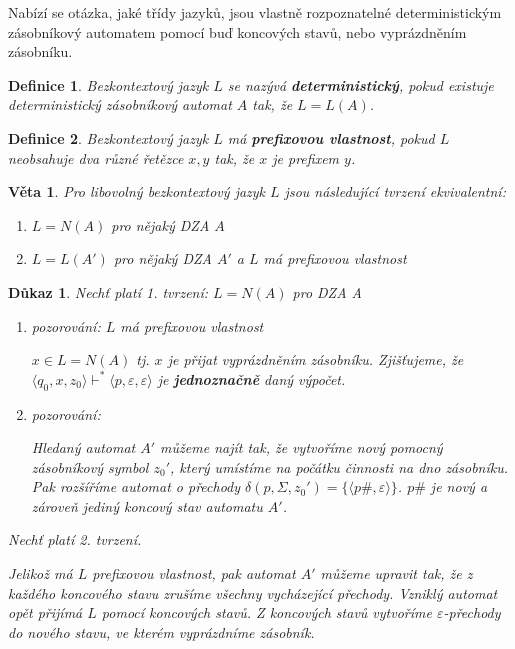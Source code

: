 \documentclass[10pt, a4paper, titlepage]{article}
\theoremstyle{note}
\newtheorem{dukaz}{Důkaz}
\newtheorem{veta}{Věta}
\newtheorem{definice}{Definice}
\begin{document}
Nabízí se otázka, jaké třídy jazyků, jsou vlastně rozpoznatelné deterministickým zásobníkový automatem pomocí buď koncových stavů, nebo vyprázdněním zásobníku.

\begin{definice}
Bezkontextový jazyk $L$ se nazývá \textbf{deterministický}, pokud existuje deterministický zásobníkový automat $A$ tak, že $L = L(A)$.
\end{definice}

\begin{definice}
Bezkontextový jazyk $L$ má \textbf{prefixovou vlastnost}, pokud $L$ neobsahuje dva různé řetězce $x,y$ tak, že $x$ je prefixem $y$.
\end{definice}

\begin{veta}
Pro libovolný bezkontextový jazyk $L$ jsou následující tvrzení ekvivalentní:
\begin{enumerate}
\item
$L = N(A)$ pro nějaký DZA $A$
\item
$L = L(A')$ pro nějaký DZA $A'$ a $L$ má prefixovou vlastnost
\end{enumerate}
\end{veta}

\begin{dukaz}
Nechť platí 1. tvrzení: $L=N(A)$ \emph{pro DZA A}

\begin{enumerate}
\item
pozorování: $L$ má prefixovou vlastnost

$x \in L=N(A)$ tj. $x$ je přijat vyprázdněním zásobníku. Zjišťujeme, že $\langle q_0,x,z_0 \rangle \vdash^* \langle p,\varepsilon,\varepsilon \rangle$ je \textbf{jednoznačně} daný výpočet.

\item
pozorování:

Hledaný automat $A'$ můžeme najít tak, že vytvoříme nový pomocný zásobníkový symbol $z_0'$, který umístíme na počátku činnosti na dno zásobníku. Pak rozšíříme automat o přechody $\delta (p,\Sigma,z_0') = \lbrace \langle p\#,\varepsilon \rangle \rbrace$. $p\#$ je nový a zároveň jediný koncový stav automatu $A'$.
\end{enumerate}

Nechť platí 2. tvrzení.

Jelikož má $L$ prefixovou vlastnost, pak automat $A'$ můžeme upravit tak, že z každého koncového stavu zrušíme všechny vycházející přechody. Vzniklý automat opět přijímá $L$ pomocí koncových stavů. Z koncových stavů vytvoříme $\varepsilon$-přechody do nového stavu, ve kterém vyprázdníme zásobník.
\end{dukaz}
\end{document}
